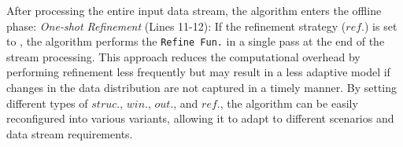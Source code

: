 After processing the entire input data stream, the algorithm enters the offline phase:
\emph{One-shot Refinement} (Lines 11-12): If the refinement strategy ($ref.$) is set to \oneshotRefinement, the algorithm performs the \texttt{Refine Fun.} in a single pass at the end of the stream processing. This approach reduces the computational overhead by performing refinement less frequently but may result in a less adaptive model if changes in the data distribution are not captured in a timely manner.
By setting different types of $struc.$, $win.$, $out.$, and $ref.$, the \algo algorithm can be easily reconfigured into various variants, allowing it to adapt to different scenarios and data stream requirements.


